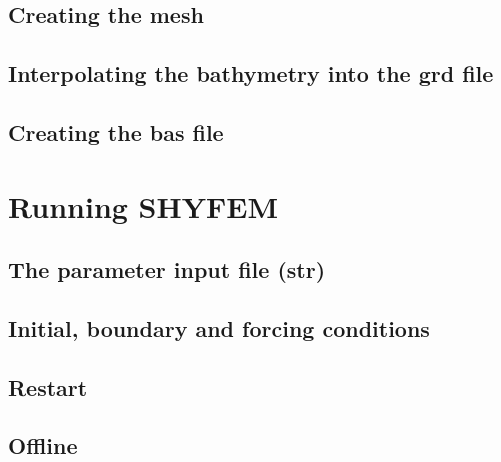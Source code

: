 \documentclass{report}
\begin{document}
	\section{Creating the mesh}
	

	\section{Interpolating the bathymetry into the grd file}
	

	\section{Creating the bas file}
	


\chapter{Running SHYFEM}

	

	\section{The parameter input file (str)}
	

	\section{Initial, boundary and forcing conditions}
	

	\section{Restart }
	

	\section{Offline}
	

\end{document}
